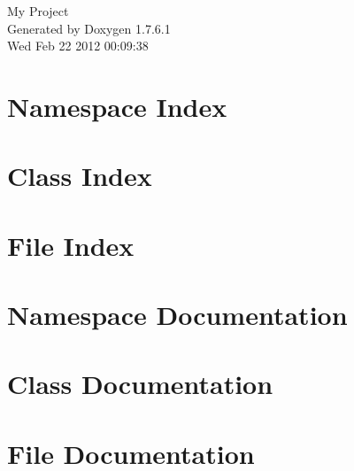 \documentclass[a4paper]{book}
\begin{document}
\hypersetup{pageanchor=false,citecolor=blue}
\begin{titlepage}
\vspace*{7cm}
\begin{center}
{\Large \-My \-Project }\\
\vspace*{1cm}
{\large \-Generated by Doxygen 1.7.6.1}\\
\vspace*{0.5cm}
{\small Wed Feb 22 2012 00:09:38}\\
\end{center}
\end{titlepage}
\clearemptydoublepage
{}
\tableofcontents
\clearemptydoublepage
{}
\hypersetup{pageanchor=true,citecolor=blue}
\chapter{\-Namespace \-Index}

\chapter{\-Class \-Index}

\chapter{\-File \-Index}

\chapter{\-Namespace \-Documentation}


\chapter{\-Class \-Documentation}














\chapter{\-File \-Documentation}


















\printindex
\end{document}
